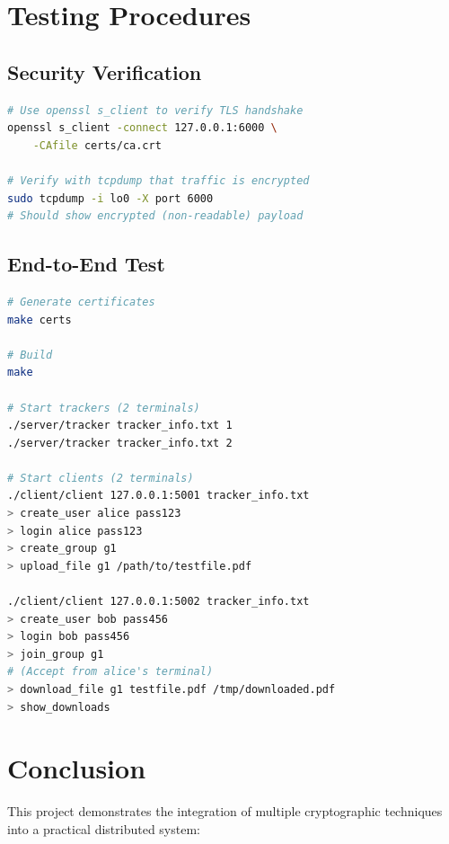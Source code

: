 \documentclass[12pt,a4paper]{article}
\begin{document}
\section{Testing Procedures}

\subsection{Security Verification}

\begin{lstlisting}[language=bash,caption={Verifying TLS is Active}]
# Use openssl s_client to verify TLS handshake
openssl s_client -connect 127.0.0.1:6000 \
    -CAfile certs/ca.crt

# Verify with tcpdump that traffic is encrypted
sudo tcpdump -i lo0 -X port 6000
# Should show encrypted (non-readable) payload
\end{lstlisting}

\subsection{End-to-End Test}

\begin{lstlisting}[language=bash,caption={Complete Test Flow}]
# Generate certificates
make certs

# Build
make

# Start trackers (2 terminals)
./server/tracker tracker_info.txt 1
./server/tracker tracker_info.txt 2

# Start clients (2 terminals)
./client/client 127.0.0.1:5001 tracker_info.txt
> create_user alice pass123
> login alice pass123
> create_group g1
> upload_file g1 /path/to/testfile.pdf

./client/client 127.0.0.1:5002 tracker_info.txt
> create_user bob pass456
> login bob pass456
> join_group g1
# (Accept from alice's terminal)
> download_file g1 testfile.pdf /tmp/downloaded.pdf
> show_downloads
\end{lstlisting}

\section{Conclusion}

This project demonstrates the integration of multiple cryptographic techniques into a practical distributed system:
\end{document}
